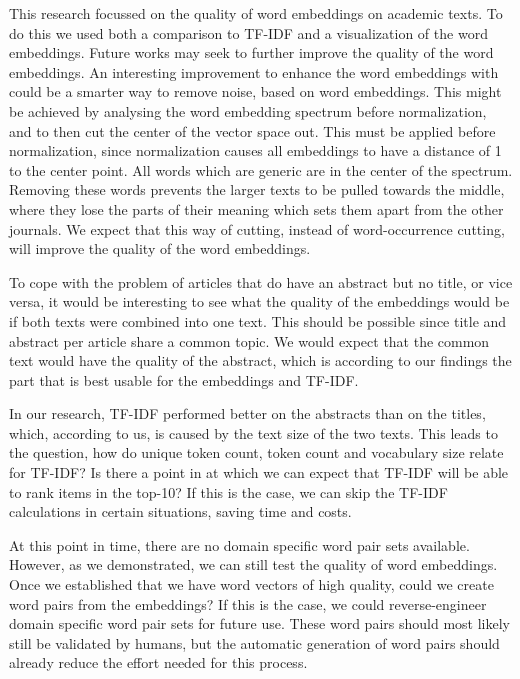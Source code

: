\documentclass[../../Thesis.tex]{subfiles}
\begin{document}
This research focussed on the quality of word embeddings on academic texts. To do this we used both a comparison to TF-IDF and a visualization of the word embeddings. Future works may seek to further improve the quality of the word embeddings. 
An interesting improvement to enhance the word embeddings with could be a smarter way to remove noise, based on word embeddings. This might be achieved by analysing the word embedding spectrum before normalization, and to then cut the center of the vector space out. This must be applied before normalization, since normalization causes all embeddings to have a distance of 1 to the center point. All words which are generic are in the center of the spectrum. Removing these words prevents the larger texts to be pulled towards the middle, where they lose the parts of their meaning which sets them apart from the other journals. We expect that this way of cutting, instead of word-occurrence cutting, will improve the quality of the word embeddings.

To cope with the problem of articles that do have an abstract but no title, or vice versa, it would be interesting to see what the quality of the embeddings would be if both texts were combined into one text. This should be possible since title and abstract per article share a common topic. We would expect that the common text would have the quality of the abstract, which is according to our findings the part that is best usable for the embeddings and TF-IDF.

In our research, TF-IDF performed better on the abstracts than on the titles, which, according to us, is caused by the text size of the two texts. This leads to the question, how do unique token count, token count and vocabulary size relate for TF-IDF? Is there a point in at which we can expect that TF-IDF will be able to rank items in the top-10? If this is the case, we can skip the TF-IDF calculations in certain situations, saving time and costs.

At this point in time, there are no domain specific word pair sets available. However, as we demonstrated, we can still test the quality of word embeddings. Once we established that we have word vectors of high quality, could we create word pairs from the embeddings? If this is the case, we could reverse-engineer domain specific word pair sets for future use. These word pairs should most likely still be validated by humans, but the automatic generation of word pairs should already reduce the effort needed for this process.
\end{document}
